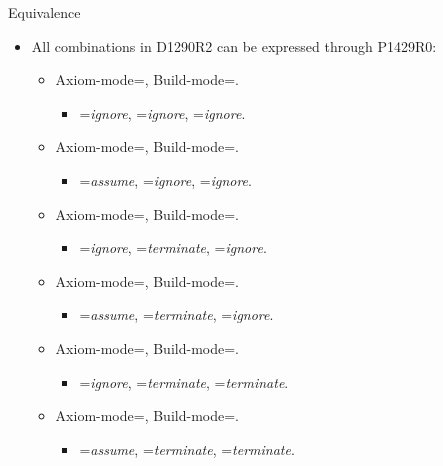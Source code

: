 \begin{frame}[t]{Equivalence}
\begin{itemize}
  \item All combinations in D1290R2 can be expressed through P1429R0:
    \begin{itemize}
      \item Axiom-mode=, Build-mode=.
        \begin{itemize}
	  \item {}=\emph{ignore}, 
		=\emph{ignore}, 
	        =\emph{ignore}.
        \end{itemize}
      \item Axiom-mode=, Build-mode=.
        \begin{itemize}
	  \item {}=\emph{assume}, 
		=\emph{ignore}, 
	        =\emph{ignore}.
        \end{itemize}
      \item Axiom-mode=, Build-mode=.
        \begin{itemize}
	  \item {}=\emph{ignore}, 
		=\emph{terminate}, 
	        =\emph{ignore}.
        \end{itemize}
      \item Axiom-mode=, Build-mode=.
        \begin{itemize}
	  \item {}=\emph{assume}, 
		=\emph{terminate}, 
	        =\emph{ignore}.
        \end{itemize}
      \item Axiom-mode=, Build-mode=.
        \begin{itemize}
	  \item {}=\emph{ignore}, 
		=\emph{terminate}, 
	        =\emph{terminate}.
        \end{itemize}
      \item Axiom-mode=, Build-mode=.
        \begin{itemize}
	  \item {}=\emph{assume}, 
		=\emph{terminate}, 
	        =\emph{terminate}.
        \end{itemize}
    \end{itemize}
\end{itemize}
\end{frame}

